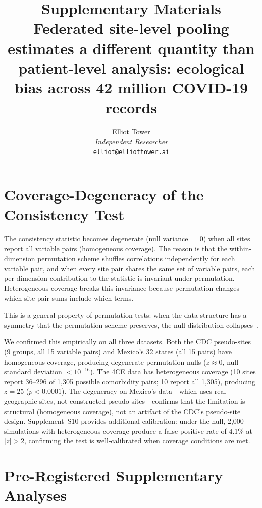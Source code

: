 \documentclass[11pt]{article}
\title{Supplementary Materials\\[6pt]
\large Federated site-level pooling estimates a different quantity
than patient-level analysis: ecological bias across
42 million COVID-19 records}
\author{Elliot Tower\\
\textit{Independent Researcher}\\
\texttt{elliot@elliottower.ai}}
\date{}
\begin{document}
\maketitle

\setcounter{section}{0}
\renewcommand{\thesection}{Supplement~\Alph{section}}


\section{Coverage-Degeneracy of the Consistency Test}
\label{supp:degeneracy}

The consistency statistic becomes degenerate (null variance $= 0$)
when all sites report all variable pairs (homogeneous coverage).
The reason is that the within-dimension permutation scheme shuffles
correlations independently for each variable pair, and when every
site pair shares the same set of variable pairs, each per-dimension
contribution to the statistic is invariant under permutation.
Heterogeneous coverage breaks this invariance because permutation
changes which site-pair sums include which terms.

This is a general property of permutation tests: when the data
structure has a symmetry that the permutation scheme preserves, the
null distribution collapses~\cite{phipson2010permutation}.

We confirmed this empirically on all three datasets.  Both the CDC
pseudo-sites (9 groups, all 15 variable pairs) and Mexico's 32 states
(all 15 pairs) have homogeneous coverage, producing degenerate
permutation nulls ($z \approx 0$, null standard deviation
$< 10^{-16}$).  The 4CE data has heterogeneous coverage (10 sites
report 36--296 of 1,305 possible comorbidity pairs; 10 report all
1,305), producing $z = 25$ ($p < 0.0001$).  The degeneracy on
Mexico's data---which uses real geographic sites, not constructed
pseudo-sites---confirms that the limitation is structural (homogeneous
coverage), not an artifact of the CDC's pseudo-site design.
Supplement~S10 provides additional calibration: under the null,
2{,}000 simulations with heterogeneous coverage produce a
false-positive rate of 4.1\% at $|z| > 2$, confirming the test is
well-calibrated when coverage conditions are met.


\section{Pre-Registered Supplementary Analyses}
\label{supp:preregistered}
\end{document}
